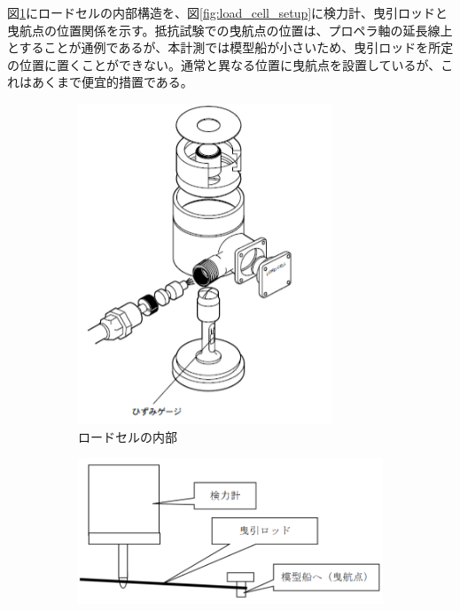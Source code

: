 \documentclass[dvipdfmx,a4paper]{jreport} %
\begin{document}
図\ref{fig:load_cell_internal}にロードセルの内部構造を、図\ref{fig:load_cell_setup}に検力計、曳引ロッドと曳航点の位置関係を示す。抵抗試験での曳航点の位置は、プロペラ軸の延長線上とすることが通例であるが、本計測では模型船が小さいため、曳引ロッドを所定の位置に置くことができない。通常と異なる位置に曳航点を設置しているが、これはあくまで便宜的措置である。

\begin{figure}[H]
    \centering
    \begin{subfigure}[b]{0.45\textwidth}
    \includegraphics[width=\textwidth]{summer/ship-experiment/circulating-water-channel/load_cell_internal.png}
        \caption{ロードセルの内部}      \label{fig:load_cell_internal}
    \end{subfigure}
    \hfill
    \begin{subfigure}[b]{0.45\textwidth}
        \includegraphics[width=\textwidth]{summer/ship-experiment/circulating-water-channel/load_cell_setup.png}

\end{subfigure}
\end{figure}
\end{document}

